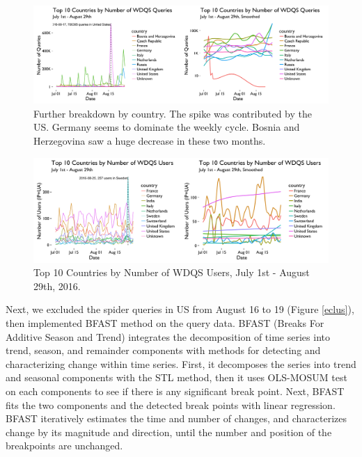 \documentclass[12pt,]{article}
\begin{document}
\begin{figure}[H]
\centering
\includegraphics{figures/query_country_ts.png}
\caption{Further breakdown by country. The spike was contributed by the
US. Germany seems to dominate the weekly cycle. Bosnia and Herzegovina
saw a huge decrease in these two months.}
\end{figure}

\begin{figure}[H]
\centering
\includegraphics{figures/user_country_ts.png}
\caption{Top 10 Countries by Number of WDQS Users, July 1st - August
29th, 2016.}
\end{figure}

Next, we excluded the spider queries in US from August 16 to 19 (Figure
\ref{eclus}), then implemented BFAST method on the query data. BFAST
(Breaks For Additive Season and Trend) integrates the decomposition of
time series into trend, season, and remainder components with methods
for detecting and characterizing change within time series. First, it
decomposes the series into trend and seasonal components with the STL
method, then it uses OLS-MOSUM test on each components to see if there
is any significant break point. Next, BFAST fits the two components and
the detected break points with linear regression. BFAST iteratively
estimates the time and number of changes, and characterizes change by
its magnitude and direction, until the number and position of the
breakpoints are unchanged.
\end{document}
